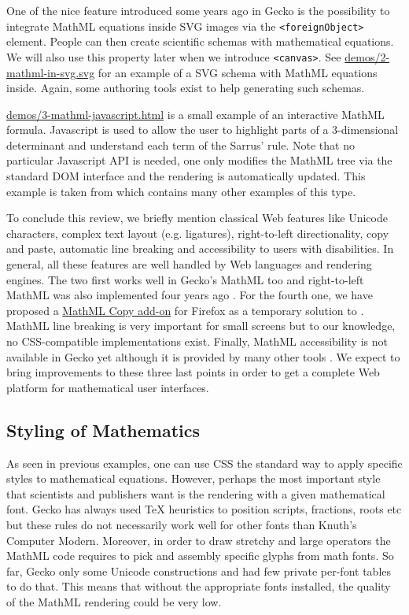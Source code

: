 One of the nice feature introduced some years ago in Gecko is the possibility
to integrate MathML equations inside SVG images via the {\tt <foreignObject>}
element. People can then create
scientific schemas with mathematical equations.
We will also use this property later when we introduce {\tt <canvas>}.
See \href{http://fred-wang.github.io/MathUI2014/demos/2-mathml-in-svg.svg}{demos/2-mathml-in-svg.svg} for an example of a SVG schema with
MathML equations inside. Again, some authoring tools exist to help generating
such schemas.

\href{http://fred-wang.github.io/MathUI2014/demos/3-mathml-javascript.html}{demos/3-mathml-javascript.html} is a small example of an
interactive MathML formula. Javascript is used to allow the user to highlight
parts of a 3-dimensional determinant and understand each term of the
Sarrus' rule. Note that no particular Javascript API is needed, one only
modifies the MathML tree via the standard DOM interface and the rendering
is automatically updated.
This example is taken from \cite{MathInEbooks} which contains
many other examples of this type.

To conclude this review, we briefly mention classical Web features like
Unicode characters, complex text layout (e.g. ligatures),
right-to-left directionality, copy and paste, automatic line breaking and
accessibility to users with disabilities.
In general, all these features are well handled by Web languages and rendering
engines. The two first works well in Gecko's MathML
too and right-to-left MathML was also implemented four years ago
\cite{BugzillaLTR}.
For the fourth one, we have proposed a
\href{https://addons.mozilla.org/en-US/firefox/addon/mathml-copy/}{MathML Copy add-on} for Firefox as a temporary solution to
\cite{BugzillaClipboard}. MathML line breaking \cite{BugzillaLinebreaking}
is very important
for small screens but to our knowledge, no CSS-compatible implementations exist.
Finally, MathML accessibility is not available in Gecko yet although it is
provided by many other tools \cite{BugzillaAccessibility}. We expect to
bring improvements to these three last points in order to get a complete Web
platform for mathematical user interfaces.

\subsection{Styling of Mathematics}

As seen in previous examples, one can use CSS the standard way to apply
specific styles to mathematical equations. However, perhaps the most important
style that scientists and publishers want is the rendering with a given
mathematical font. Gecko has always used TeX heuristics to position scripts,
fractions, roots etc but these rules do not necessarily work well for other
fonts than Knuth's Computer Modern. Moreover, in order to draw stretchy and
large operators the MathML code requires to pick and assembly specific glyphs
from math fonts. So far, Gecko only some Unicode constructions and had
few private per-font tables to do that. This means that without the appropriate
fonts installed, the quality of the MathML rendering could be very low.

